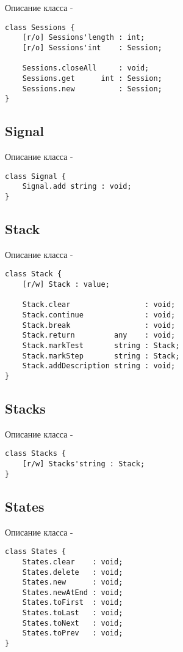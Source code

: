 \noindent Описание класса  -
\begin{lstlisting}[numbers=none]
class Sessions {
    [r/o] Sessions'length : int;
	[r/o] Sessions'int    : Session;
	
    Sessions.closeAll     : void;
	Sessions.get      int : Session;
	Sessions.new          : Session;
}
\end{lstlisting}

\subsection{{\color{orange} Signal}}

\noindent Описание класса  -
\begin{lstlisting}[numbers=none]
class Signal {
    Signal.add string : void;
}
\end{lstlisting}

\subsection{{\color{orange} Stack}}

\noindent Описание класса  -
\begin{lstlisting}[numbers=none]
class Stack {
    [r/w] Stack : value;
	
    Stack.clear                 : void;
	Stack.continue              : void;
	Stack.break                 : void;
	Stack.return         any    : void;
	Stack.markTest       string : Stack;
	Stack.markStep       string : Stack;
	Stack.addDescription string : void;
}
\end{lstlisting}

\subsection{{\color{orange} Stacks}}

\noindent Описание класса  -
\begin{lstlisting}[numbers=none]
class Stacks {
    [r/w] Stacks'string : Stack;
}
\end{lstlisting}

\subsection{{\color{orange} States}}

\noindent Описание класса  -
\begin{lstlisting}[numbers=none]
class States {
    States.clear    : void;
	States.delete   : void;
	States.new      : void;
	States.newAtEnd : void;
	States.toFirst  : void;
	States.toLast   : void;
	States.toNext   : void;
	States.toPrev   : void;
}
\end{lstlisting}

